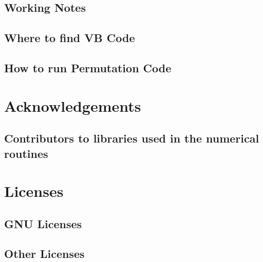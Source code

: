 \documentclass[12pt,a4paper,openany]{book}
\begin{document}
\section{Working Notes}

\section{Where to find VB Code}

\section{How to run Permutation Code}

\chapter{Acknowledgements}

\section{Contributors to libraries used in the numerical routines}

\chapter{Licenses}

\section{GNU Licenses}

\section{Other Licenses}

\chapter{\tocbibname }
\end{document}
